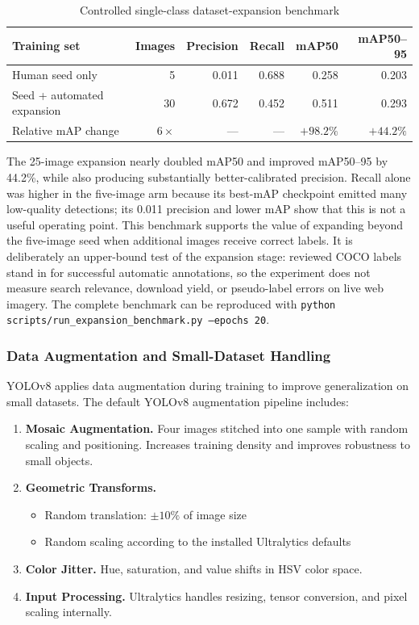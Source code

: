 \documentclass[12pt, letterpaper]{article}
\newcommand{\code}[1]{\texttt{\small\colorbox{codebg}{#1}}}
\begin{document}
\begin{table}[H]
  \centering
  \caption{Controlled single-class dataset-expansion benchmark}
  \begin{tabular}{@{} l r r r r r @{} }
    \toprule
    \textbf{Training set} & \textbf{Images} & \textbf{Precision} & \textbf{Recall} & \textbf{mAP50} & \textbf{mAP50--95} \\
    \midrule
    Human seed only & 5 & 0.011 & 0.688 & 0.258 & 0.203 \\
    Seed + automated expansion & 30 & 0.672 & 0.452 & 0.511 & 0.293 \\
    \midrule
    Relative mAP change & $6\times$ & --- & --- & $+98.2\%$ & $+44.2\%$ \\
    \bottomrule
  \end{tabular}
\end{table}

The 25-image expansion nearly doubled mAP50 and improved mAP50--95 by 44.2\%, while
also producing substantially better-calibrated precision. Recall alone was higher in the
five-image arm because its best-mAP checkpoint emitted many low-quality detections; its
0.011 precision and lower mAP show that this is not a useful operating point. This benchmark
supports the value of expanding beyond the five-image seed when additional images receive
correct labels. It is deliberately an upper-bound test of the expansion stage: reviewed COCO
labels stand in for successful automatic annotations, so the experiment does not measure
search relevance, download yield, or pseudo-label errors on live web imagery. The complete
benchmark can be reproduced with
\code{python scripts/run\_expansion\_benchmark.py --epochs 20}.

\subsubsection{Data Augmentation and Small-Dataset Handling}

YOLOv8 applies data augmentation during training to improve generalization on small datasets. 
The default YOLOv8 augmentation pipeline includes:

\begin{enumerate}
  \item \textbf{Mosaic Augmentation.} Four images stitched into one sample with random scaling and 
    positioning. Increases training density and improves robustness to small objects.
  \item \textbf{Geometric Transforms.} 
    \begin{itemize}
      \item Random translation: $\pm 10\%$ of image size
      \item Random scaling according to the installed Ultralytics defaults
    \end{itemize}
  \item \textbf{Color Jitter.} Hue, saturation, and value shifts in HSV color space.
  \item \textbf{Input Processing.} Ultralytics handles resizing, tensor conversion, and
    pixel scaling internally.
\end{enumerate}
\end{document}
